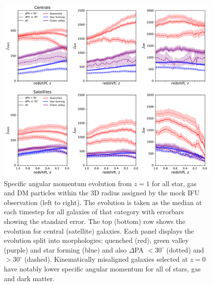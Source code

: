 \documentclass[fleqn,usenatbib]{mnras}
\begin{document}
\begin{figure}
	\includegraphics[width=\linewidth]{tng_results/sJ_evo_cen_sat.pdf}
    \caption{Specific angular momentum evolution from $z = 1$ for all star, gas and DM particles within the 3D radius assigned by the mock IFU observation (left to right). The evolution is taken as the median at each timestep for all galaxies of that category with errorbars showing the standard error. The top (bottom) row shows the evolution for central (satellite) galaxies. Each panel displays the evolution split into morphologies; quenched (red), green valley (purple) and star forming (blue) and also $\Delta$PA $< 30^{\circ}$ (dotted) and $> 30^{\circ}$ (dashed). Kinematically misaligned galaxies selected at $z=0$ have notably lower specific angular momentum for all of stars, gas and dark matter.}
    \label{fig:sJ_evo}
\end{figure}
\end{document}
